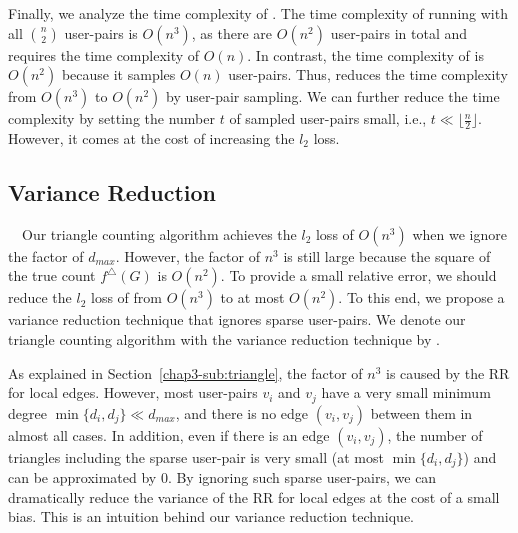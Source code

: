 Finally, we analyze the time complexity of \AlgWSTri{}. 
The time complexity of running \AlgWS{} with all $\binom{n}{2}$ user-pairs is $O(n^3)$, as there are $O(n^2)$ user-pairs in total and \AlgWS{} requires the time complexity of $O(n)$. 
In contrast, the time complexity of \AlgWSTri{} is $O(n^2)$ because it samples $O(n)$ user-pairs. 
Thus, \AlgWSTri{} reduces the time complexity from $O(n^3)$ to $O(n^2)$ by user-pair sampling. 
We can further reduce the time complexity by setting the number $t$ of sampled user-pairs small, i.e., $t \ll \lfloor \frac{n}{2} \rfloor$. 
However, it comes at the cost of increasing the $l_2$ loss. 

\subsection{Variance Reduction}
\label{chap3-sub:var_red}
~~Our 
triangle counting algorithm \AlgWSTri{} achieves the $l_2$ loss of $O(n^3)$ when we ignore the factor of $d_{max}$. 
However, the factor of $n^3$ is still large because the square of the true count $f^\triangle(G)$ is $O(n^2)$. 
To provide a small relative error, we should reduce the $l_2$ loss of \AlgWSTri{} from $O(n^3)$ to at most $O(n^2)$. 
To this end, we propose a variance reduction technique that ignores sparse user-pairs. 
We denote our triangle counting algorithm with the variance reduction technique by \AlgWSTriVR{}. 

As explained in Section~\ref{chap3-sub:triangle}, the factor of $n^3$ is caused by the RR for local edges. 
However, most user-pairs $v_i$ and $v_j$ have a very small minimum degree 
$\min\{d_i, d_j\} \ll d_{max}$, 
and there is no edge $(v_i, v_j)$ between them in almost all cases. 
In addition, even if there is an edge $(v_i, v_j)$, the number of triangles including the sparse user-pair is very small 
(at most $\min\{d_i, d_j\}$) 
and can be approximated by $0$. 
By ignoring such sparse user-pairs, we can dramatically reduce the variance of the RR for local edges at the cost of a small bias. 
This is an intuition behind our variance reduction technique. 


